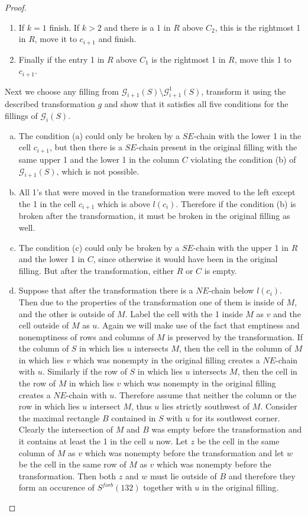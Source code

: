 \begin{proof}
\begin{enumerate}
\item If $k = 1$ finish. If $k > 2$ and there is a 1 in $R$ above $C_2$, this is the rightmost 1 in $R$, move it to $c_{i+1}$ and finish.

\item Finally if the entry 1 in $R$ above $C_1$ is the rightmost 1 in $R$, move this 1 to $c_{i+1}$.
\end{enumerate}

Next we choose any filling from $\mathcal{G}_{i+1}(S) \setminus \mathcal{G}_{i+1}^1(S)$, transform it using the described transformation $g$ and show
that it satisfies all five conditions for the fillings of $\mathcal{G}_i(S)$.

\begin{enumerate}[(a)]
\item The condition (a) could only be broken by a $SE$-chain with the lower 1 in the cell $c_{i+1}$, but then there is a $SE$-chain
present in the original filling with the same upper 1 and the lower 1 in the column $C$ violating
 the condition (b) of $\mathcal{G}_{i+1}(S)$, which is not possible.
\item All 1's that were moved in the transformation were moved to the left except the 1 in the cell $c_{i+1}$ which is above $l(c_i)$. Therefore
if the condition (b) is broken after the transformation, it must be broken in the original filling as well.
\item The condition (c) could only be broken by a $SE$-chain with the upper 1 in $R$ and the lower 1 in $C$, since otherwise it would
have been in the original filling. But after the transformation, either $R$ or $C$ is empty.
\item Suppose that after the transformation there is a $NE$-chain below $l(c_i)$. Then due to the properties of the transformation
one of them is inside of $M$, and the other is outside of $M$. Label the cell with the 1 inside $M$ as $v$
and the cell outside of $M$ as $u$. Again we will make use of the fact
that emptiness and nonemptiness of rows and columns of $M$ is preserved by the transformation.
If the column of $S$ in which lies $u$ intersects $M$, then the cell in the column of $M$ in which lies $v$ which was nonempty
in the original filling creates a $NE$-chain with $u$. Similarly if the row of $S$ in which lies $u$ intersects $M$, then the cell
in the row of $M$ in which lies $v$ which was nonempty in the original filling creates a $NE$-chain with $u$. Therefore
assume that neither the column or the row in which lies $u$ intersect $M$, thus $u$ lies strictly southwest of $M$.
Consider the maximal rectangle $B$ contained in $S$ with $u$ for its southwest corner. Clearly the intersection of $M$ and $B$
was empty before the transformation and it contains at least the 1 in the cell $u$ now. Let $z$ be the cell in the same column of $M$
as $v$ which was nonempty before the transformation and let $w$ be the cell in the same row of $M$ as $v$ which was nonempty before the transformation.
Then both $z$ and $w$ must lie outside of $B$ and therefore they form an occurence of $S^{forb}(132)$ together with $u$ in the original filling.


\end{enumerate}
\end{proof}
